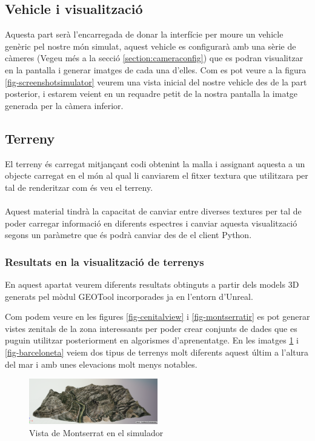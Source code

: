 \documentclass[10pt,a4paper]{article}
\begin{document}
\subsection{Vehicle i visualització}
Aquesta part serà l'encarregada de donar la interfície per moure un vehicle genèric pel nostre món simulat, aquest vehicle es configurarà amb una sèrie de càmeres (Vegeu més a la secció \ref{section:cameraconfig}) que es podran visualitzar en la pantalla i generar imatges de cada una d'elles. Com es pot veure a la figura \ref{fig-screenshotsimulator} veurem una vista inicial del nostre vehicle des de la part posterior, i estarem veient en un requadre petit de la nostra pantalla la imatge generada per la càmera inferior.

\subsection{Terreny}
El terreny és carregat mitjançant codi obtenint la malla i assignant aquesta a un objecte carregat en el món al qual li canviarem el fitxer textura que utilitzara per tal de renderitzar com és veu el terreny. 
\\
\\
Aquest material tindrà la capacitat de canviar entre diverses textures per tal de poder carregar informació en diferents espectres i canviar aquesta visualització segons un paràmetre que és podrà canviar des de el client Python.

\subsubsection{Resultats en la visualització de terrenys}
En aquest apartat veurem diferents resultats obtinguts a partir dels models 3D generats pel mòdul GEOTool incorporades ja en l'entorn d'Unreal.

Com podem veure en les figures \ref{fig-cenitalview} i \ref{fig-montserratir} es pot generar vistes zenitals de la zona interessants per poder crear conjunts de dades que es puguin utilitzar posteriorment en algorismes d'aprenentatge. En les imatges \ref{fig-montserrat} i \ref{fig-barceloneta} veiem dos tipus de terrenys molt diferents aquest últim a l'altura del mar i amb unes elevacions molt menys notables.

\begin{figure}[!h]
\centering
    \includegraphics[width=0.5\textwidth]{montserrat}
  \caption{Vista de Montserrat en el simulador}
  \label{fig-montserrat}
\end{figure}
\end{document}
